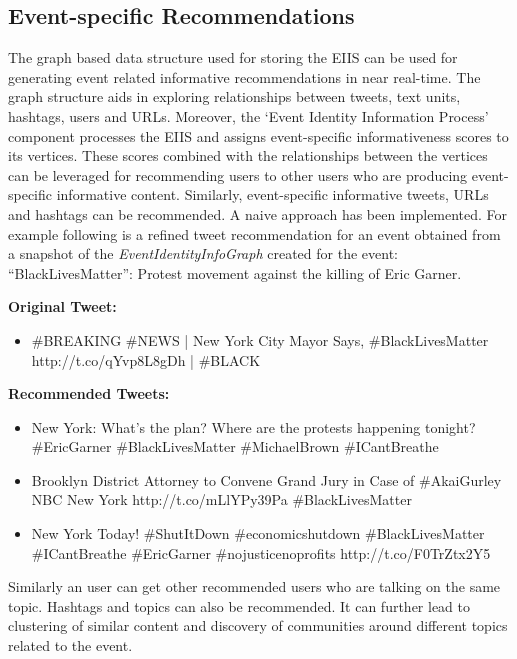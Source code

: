 \subsection{Event-specific Recommendations}
The graph based data structure used for storing the EIIS can be used for generating event related informative recommendations in near real-time. The graph structure aids in exploring relationships between tweets, text units, hashtags, users and URLs. Moreover, the `Event Identity Information Process' component processes the EIIS and assigns event-specific informativeness scores to its vertices. These scores combined with the relationships between the vertices can be leveraged for recommending users to other users who are producing event-specific informative content. Similarly, event-specific informative tweets, URLs and hashtags can be recommended. A naive approach has been implemented. For example following is a refined tweet recommendation for an event obtained from a snapshot of the \textit{EventIdentityInfoGraph} created for the event: “BlackLivesMatter”: Protest movement against the killing of Eric Garner.

\textbf{Original Tweet:}

\begin{itemize}
\item \#BREAKING \#NEWS | New York City Mayor Says, \#BlackLivesMatter \\ http://t.co/qYvp8L8gDh | \#BLACK  
\end{itemize}

\textbf{Recommended Tweets:}

\begin{itemize}

\item New York: What's the plan? Where are the protests happening tonight? \#EricGarner \#BlackLivesMatter \#MichaelBrown \#ICantBreathe

\item Brooklyn District Attorney to Convene Grand Jury in Case of \#AkaiGurley NBC New York http://t.co/mLlYPy39Pa \#BlackLivesMatter

\item New York Today! \#ShutItDown \#economicshutdown \#BlackLivesMatter \#ICantBreathe \#EricGarner \#nojusticenoprofits http://t.co/F0TrZtx2Y5

\end{itemize}

Similarly an user can get other recommended users who are talking on the same topic. Hashtags and topics can also be recommended. It can further lead to clustering of similar content and discovery of communities around different topics related to the event.



